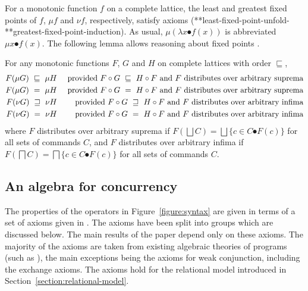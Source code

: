\documentclass[fleqn]{fac}
\makeatletter
\def\refaxiom{\@ifnextchar*{\@refaxiom}{\@@refaxiom}}
\def\@refaxiom*#1{\ref{axiom-#1}\index{Axiom!#1|LawUse}}
\def\@@refaxiom#1{axiom~(\ref{axiom-#1})\index{Axiom!#1|LawUse}}
\newcommand{\labelproperty}[1]{\label{property-#1}\index{Property!#1|PropertyDef{\ref{property-#1}}}}
\newcommand{\refines}{\mathrel{\sqsupseteq}}\newcommand{\refsto}{\mathrel{\sqsubseteq}}
\newcommand{\Nondet}{\mathop{\textstyle\bigsqcap}}
\newcommand{\Angelic}{\mathop{\textstyle\bigsqcup}}
\newcommand{\strictconjunction}{weak conjunction}
\makeatother
\begin{document}
For a monotonic function $f$ on a complete lattice,
the least and greatest fixed points of $f$, $\mu f$ and $\nu f$, respectively, satisfy 
axioms (\refaxiom*{least-fixed-point-unfold}-\refaxiom*{greatest-fixed-point-induction}).
As usual, $\mu(\lambda x \spot f(x))$ is abbreviated $\mu x \spot f(x)$.
The following lemma allows reasoning about fixed points \cite{fixedpointcalculus1995,BackWright98}.
\newcommand{\FF}{F}
\newcommand{\GG}{G}
\newcommand{\HH}{H}
\begin{lemmax}[fusion]
For any monotonic functions $\FF$, $\GG$ and $\HH$ on complete lattices with order $\refsto$, 
\begin{eqnarray}
   \FF(\mu \GG) ~\refsto~ \mu \HH  && \mbox{ provided } \FF \circ \GG ~\refsto~ \HH \circ \FF
        \mbox{ and } \FF \mbox{ distributes over arbitrary suprema}
     \labelproperty{fusion-lfp-leq}
\\
   \FF(\mu \GG) ~=~ \mu \HH  && \mbox{ provided } \FF \circ \GG ~=~ \HH \circ \FF
        \mbox{ and } \FF \mbox{ distributes over arbitrary suprema}
     \labelproperty{fusion-lfp-eq}
\\
  \FF(\nu \GG) ~\refines~ \nu \HH    && \mbox{ provided } \FF \circ \GG ~\refines~ \HH \circ \FF
        \mbox{ and } \FF \mbox{ distributes over arbitrary infima}
     \labelproperty{fusion-gfp-geq}
\\
  \FF(\nu \GG) ~=~ \nu \HH    && \mbox{ provided } \FF \circ \GG ~=~ \HH \circ \FF
        \mbox{ and } \FF \mbox{ distributes over arbitrary infima}
     \labelproperty{fusion-gfp-eq}
\end{eqnarray}
where 
$\FF$ distributes over arbitrary suprema if 
$\FF(\Angelic C) = \Angelic \{ c \in C \spot \FF(c) \}$ for all sets of commands $C$,
and
$\FF$ distributes over arbitrary infima if 
$\FF(\Nondet C) = \Nondet \{ c \in C \spot \FF(c) \}$ for all sets of commands $C$.
\end{lemmax}





\subsection{An algebra for concurrency}\label{section:basic-algebra}

The properties of the operators in Figure~\ref{figure:syntax} are given 
in terms of a set of axioms given in .
The axioms have been split into groups which are discussed below.
The main results of the paper depend only on these axioms.
The majority of the axioms are taken from existing algebraic theories of programs 
(such as \cite{Wright04,DBLP:journals/jlp/HoareMSW11}),
the main exceptions being the axioms for \strictconjunction, including the exchange axioms.
The axioms hold for the relational model introduced in Section~\ref{section:relational-model}. 
\end{document}
